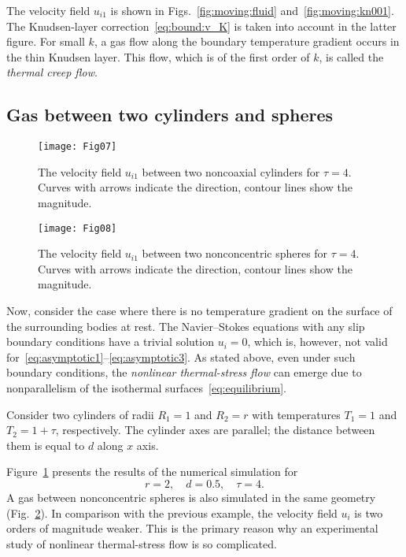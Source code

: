 \documentclass[smallextended, final]{svjour3} %
\begin{document}
The velocity field \(u_{i1}\) is shown in Figs.~\ref{fig:moving:fluid} and~\ref{fig:moving:kn001}.
The Knudsen-layer correction~\eqref{eq:bound:v_K} is taken into account in the latter figure.
For small \(k\), a gas flow along the boundary temperature gradient occurs
in the thin Knudsen layer. This flow, which is of the first order of \(k\), is called
the \emph{thermal creep flow}.

\subsection{Gas between two cylinders and spheres}

\begin{figure}
    \centering
    \texttt{[image: Fig07]}
    \caption{The velocity field \(u_{i1}\) between two noncoaxial cylinders for \(\tau=4\).
        Curves with arrows indicate the direction, contour lines show the magnitude.}
    \label{fig:cylinders}
\end{figure}

\begin{figure}
    \centering
    \texttt{[image: Fig08]}
    \caption{The velocity field \(u_{i1}\) between two nonconcentric spheres for \(\tau=4\).
        Curves with arrows indicate the direction, contour lines show the magnitude.}
    \label{fig:spheres}
\end{figure}

Now, consider the case where there is no temperature gradient on the surface of the surrounding bodies at rest.
The Navier--Stokes equations with any slip boundary conditions have a trivial solution \(u_i = 0\),
which is, however, not valid for~\eqref{eq:asymptotic1}--\eqref{eq:asymptotic3}.
As stated above, even under such boundary conditions, the \emph{nonlinear thermal-stress flow}
can emerge due to nonparallelism of the isothermal surfaces~\eqref{eq:equilibrium}.

Consider two cylinders of radii \(R_1 = 1\) and \(R_2 = r\)
with temperatures \(T_1 = 1\) and \(T_2 = 1+\tau\), respectively.
The cylinder axes are parallel; the distance between them is equal to \(d\) along \(x\) axis.

Figure~\ref{fig:cylinders} presents the results of the numerical simulation for
\[ r = 2, \quad d = 0.5, \quad \tau = 4. \]
A gas between nonconcentric spheres is also simulated in the same geometry (Fig.~\ref{fig:spheres}).
In comparison with the previous example, the velocity field \(u_i\) is two orders of magnitude weaker.
This is the primary reason why an experimental study of nonlinear thermal-stress flow is so complicated.
\end{document}
